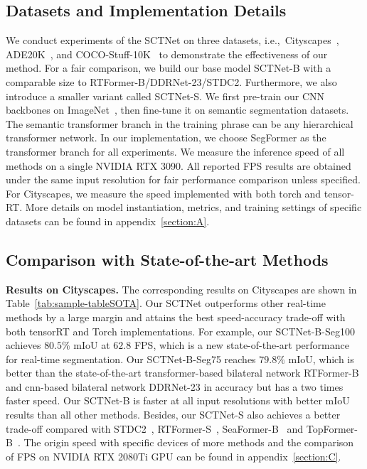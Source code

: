 \documentclass[letterpaper]{article} %
\begin{document}
\subsection{Datasets and Implementation Details}
We conduct experiments of the SCTNet on three datasets, i.e.,~Cityscapes~\cite{cordts2016cityscapes}, ADE20K~\cite{zhou2017scene}, and COCO-Stuff-10K~\cite{caesar2018coco} to demonstrate the effectiveness of our method. For a fair comparison, we build our base model SCTNet-B with a comparable size to RTFormer-B/DDRNet-23/STDC2. Furthermore, we also introduce a smaller variant called SCTNet-S. We first pre-train our CNN backbones on ImageNet~\cite{deng2009imagenet}, then fine-tune it on semantic segmentation datasets. 
The semantic transformer branch in the training phrase can be any hierarchical transformer network.
In our implementation, we choose SegFormer as the transformer branch for all experiments. 
We measure the inference speed of all methods on a single NVIDIA RTX 3090.
All reported FPS results are obtained under the same input resolution for fair performance comparison unless specified.
For Cityscapes, we measure the speed implemented with both torch and tensor-RT. More details on model instantiation, metrics, and training settings of specific datasets can be found in appendix~\ref{section:A}. 

\subsection{Comparison with State-of-the-art Methods}


\noindent
{\bf Results on Cityscapes.} The corresponding results on Cityscapes\cite{cordts2016cityscapes} are shown in Table~\ref{tab:sample-tableSOTA}. Our SCTNet outperforms other real-time methods by a large margin and attains the best speed-accuracy trade-off with both tensorRT and Torch implementations. For example, our SCTNet-B-Seg100 achieves $80.5\%$ mIoU at $62.8$ FPS, which is a new state-of-the-art performance for real-time segmentation. Our SCTNet-B-Seg75 reaches $79.8\%$ mIoU, which is better than the state-of-the-art transformer-based bilateral network RTFormer-B and cnn-based bilateral network DDRNet-23 in accuracy but has a two times faster speed. Our SCTNet-B is faster at all input resolutions with better mIoU results than all other methods. Besides, our SCTNet-S also achieves a better trade-off compared with STDC2~\cite{fan2021rethinking}, RTFormer-S~\cite{wang2022rtformer}, SeaFormer-B~\cite{wan2023seaformer} and TopFormer-B~\cite{zhang2022topformer}. The origin speed with specific devices of more methods and the comparison of FPS on NVIDIA RTX 2080Ti GPU can be found in appendix~\ref{section:C}.
\end{document}
